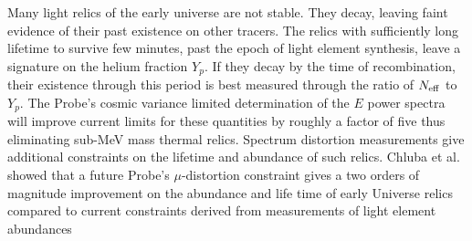 Many light relics of the early universe are not stable. They decay, 
leaving faint evidence of their past existence on other tracers. The relics with sufficiently long lifetime to survive few minutes, 
past the epoch of light element synthesis, leave a signature on the helium fraction $Y_p$.  If they decay 
by the time of recombination, their existence through this period is best measured through the ratio of ${N_{\rm eff}}$ to $Y_p$. 
The Probe's cosmic variance limited determination 
of the $E$ power spectra will improve current limits for these quantities by roughly a factor of five thus eliminating sub-MeV mass thermal relics.   
Spectrum distortion measurements give additional constraints on the lifetime and abundance 
of such relics. Chluba et al. showed that a future Probe's $\mu$-distortion constraint gives a two orders of magnitude
improvement on the abundance and life time of early Universe relics compared to current constraints derived 
from measurements of light element abundances 



